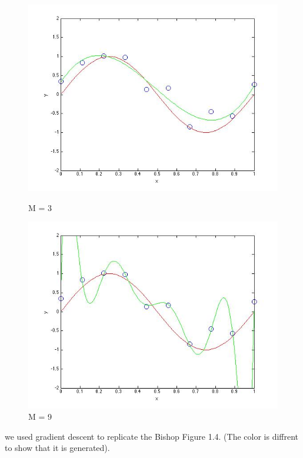 \begin{figure}[!htb]
  \includegraphics[width=\linewidth]{figures/p2_M=3}
  \caption{M = 3}\label{fig:figures/p2_M=3}
\endminipage\hfill
{}                                                                            
  \includegraphics[width=\linewidth]{figures/p2_M=9}
  \caption{M = 9}\label{fig:figures/p2_M=9}
\endminipage\hfill
\end{figure}


we used gradient descent to replicate 
the Bishop Figure 1.4. (The color is diffrent to show that it is generated). 

